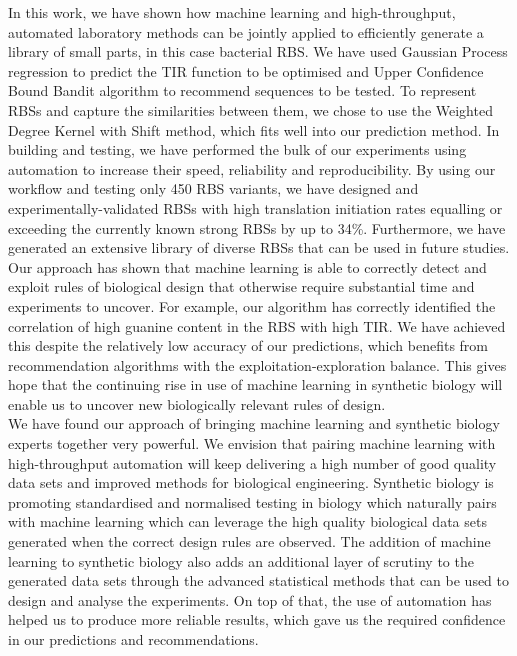 \documentclass{article}
\begin{document}
In this work, we have shown how machine learning and high-throughput, automated laboratory methods can be jointly applied to efficiently generate a library of small parts, in this case bacterial RBS. 
We have used Gaussian Process regression to predict the TIR function to be optimised and Upper Confidence Bound Bandit algorithm to recommend sequences to be tested.
To represent RBSs and capture the similarities between them, we chose to use the
Weighted Degree Kernel with Shift method, which fits well into our prediction method.
In building and testing, we have performed the bulk of our experiments using automation to increase their speed, reliability and reproducibility.
By using our workflow and testing only 450 RBS variants, we have designed and experimentally-validated RBSs with high translation initiation rates equalling or exceeding the currently known strong RBSs by up to 34\%.
Furthermore, we have generated an extensive library of diverse RBSs that can be used in future studies.\\

Our approach has shown that machine learning is able to correctly detect and exploit rules of biological design that otherwise require substantial time and experiments to uncover.
For example, our algorithm has correctly identified the correlation of high guanine content in the RBS with high TIR.
We have achieved this despite the relatively low accuracy of our predictions, which benefits from recommendation algorithms with the exploitation-exploration balance.
This gives hope that the continuing rise in use of machine learning in synthetic biology will enable us to uncover new biologically relevant rules of design.\\

We have found our approach of bringing machine learning and synthetic biology experts together very powerful.
We envision that pairing machine learning with high-throughput automation will keep delivering a high number of good quality data sets and improved methods for biological engineering.
Synthetic biology is promoting standardised and normalised testing in biology which naturally pairs with machine learning which can leverage the high quality biological data sets generated when the correct design rules are observed.
The addition of machine learning to synthetic biology also adds an additional layer of scrutiny to the generated data sets through the advanced statistical methods that can be used to design and analyse the experiments.
On top of that, the use of automation has helped us to produce more reliable results, which gave us the required confidence in our predictions and recommendations.\\
\end{document}
